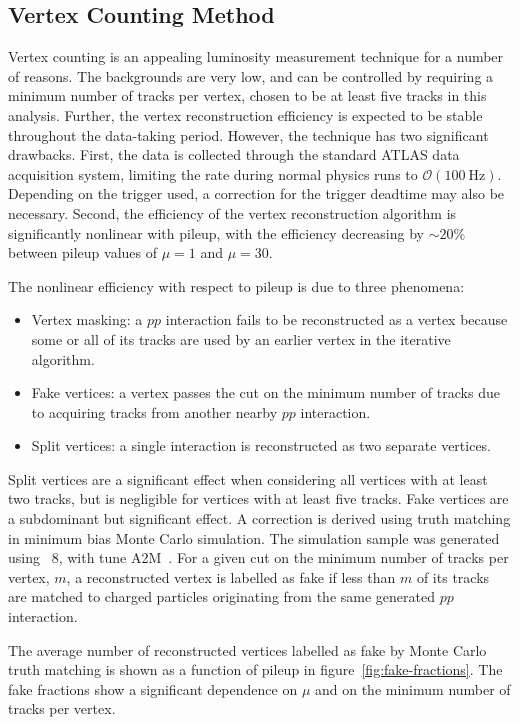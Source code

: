 \subsection{Vertex Counting Method}
Vertex counting is an appealing luminosity measurement technique for a number of reasons. The backgrounds are very low, and can be controlled by requiring a minimum number of tracks per vertex, chosen to be at least five tracks in this analysis. Further, the vertex reconstruction efficiency is expected to be stable throughout the data-taking period. However, the technique has two significant drawbacks. First, the data is collected through the standard ATLAS data acquisition system, limiting the rate during normal physics runs to $\mathcal{O}(\SI{100}{\hertz})$. Depending on the trigger used, a correction for the trigger deadtime may also be necessary. Second, the efficiency of the vertex reconstruction algorithm is significantly nonlinear with pileup, with the efficiency decreasing by $\sim20\%$ between pileup values of $\mu=1$ and $\mu=30$. 

The nonlinear efficiency with respect to pileup is due to three phenomena:

\begin{itemize}
	\item Vertex masking: a $pp$ interaction fails to be reconstructed as a vertex because some or all of its tracks are used by an earlier vertex in the iterative algorithm. 
	\item Fake vertices: a vertex passes the cut on the minimum number of tracks due to acquiring tracks from another nearby $pp$ interaction.
	\item Split vertices: a single interaction is reconstructed as two separate vertices.
\end{itemize}

Split vertices are a significant effect when considering all vertices with at least two tracks, but is negligible for vertices with at least five tracks. Fake vertices are a subdominant but significant effect. A correction is derived using truth matching in minimum bias Monte Carlo simulation. The simulation sample was generated using \pythia~8, with tune A2M~\cite{pythia}. For a given cut on the minimum number of tracks per vertex, $m$, a reconstructed vertex is labelled as fake if less than $m$ of its tracks are matched to charged particles originating from the same generated $pp$ interaction.

The average number of reconstructed vertices labelled as fake by Monte Carlo truth matching is shown as a function of pileup in figure~\ref{fig:fake-fractions}. The fake fractions show a significant dependence on $\mu$ and on the minimum number of tracks per vertex.

